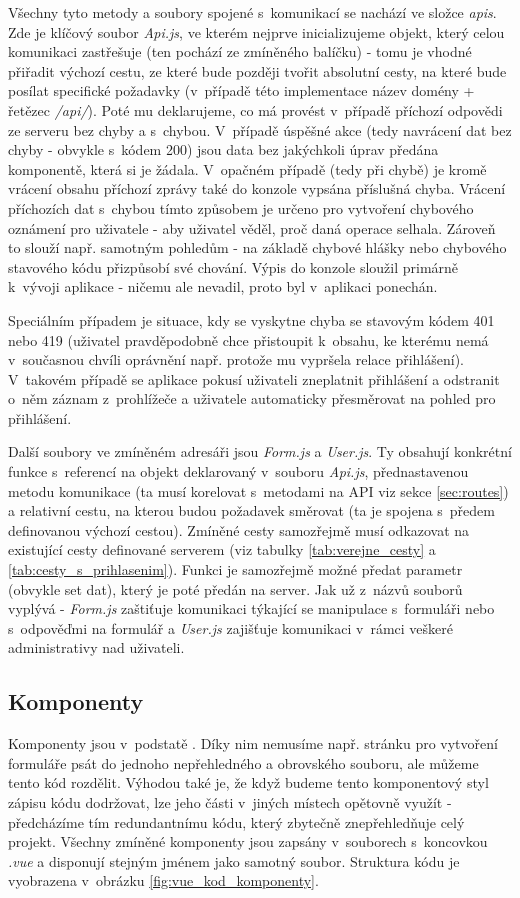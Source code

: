 	Všechny tyto metody a soubory spojené s~komunikací se nachází ve složce \textit{apis}. Zde je klíčový soubor \textit{Api.js}, ve kterém nejprve inicializujeme objekt, který celou komunikaci zastřešuje (ten pochází ze zmíněného balíčku) - tomu je vhodné přiřadit výchozí cestu, ze které bude později tvořit absolutní cesty, na které bude posílat specifické požadavky (v~případě této implementace název domény + řetězec \textit{/api/}). Poté mu deklarujeme, co má provést v~případě příchozí odpovědi ze serveru bez chyby a s~chybou. V~případě úspěšné akce (tedy navrácení dat bez chyby - obvykle s~kódem 200) jsou data bez jakýchkoli úprav předána komponentě, která si je žádala. V~opačném případě (tedy při chybě) je kromě vrácení obsahu příchozí zprávy také do konzole vypsána příslušná chyba. Vrácení příchozích dat s~chybou tímto způsobem je určeno pro vytvoření chybového oznámení pro uživatele - aby uživatel věděl, proč daná operace selhala. Zároveň to slouží např. samotným pohledům - na základě chybové hlášky nebo chybového stavového kódu přizpůsobí své chování. Výpis do konzole sloužil primárně k~vývoji aplikace - ničemu ale nevadil, proto byl v~aplikaci ponechán. 
	
	Speciálním případem je situace, kdy se vyskytne chyba se stavovým kódem 401 nebo 419 (uživatel pravděpodobně chce přistoupit k~obsahu, ke kterému nemá v~současnou chvíli oprávnění např. protože mu vypršela relace přihlášení). V~takovém případě se aplikace pokusí uživateli zneplatnit přihlášení a odstranit o~něm záznam z~prohlížeče a uživatele automaticky přesměrovat na pohled pro přihlášení.
	
	Další soubory ve zmíněném adresáři jsou \textit{Form.js} a \textit{User.js}. Ty obsahují konkrétní funkce s~referencí na objekt deklarovaný v~souboru \textit{Api.js}, přednastavenou metodu komunikace (ta musí korelovat s~metodami na API viz sekce \ref{sec:routes}) a relativní cestu, na kterou budou požadavek směrovat (ta je spojena s~předem definovanou výchozí cestou). Zmíněné cesty samozřejmě musí odkazovat na existující cesty definované serverem (viz tabulky \ref{tab:verejne_cesty} a \ref{tab:cesty_s_prihlasenim}). Funkci je samozřejmě možné předat parametr (obvykle set dat), který je poté předán na server. Jak už z~názvů souborů vyplývá - \textit{Form.js} zaštiťuje komunikaci týkající se manipulace s~formuláři nebo s~odpověďmi na formulář a \textit{User.js} zajišťuje komunikaci v~rámci veškeré administrativy nad uživateli.
	
	\subsection{Komponenty}\label{sec:komponenty}
	Komponenty jsou v~podstatě . Díky nim nemusíme např. stránku pro vytvoření formuláře psát do jednoho nepřehledného a obrovského souboru, ale můžeme tento kód rozdělit. Výhodou také je, že když budeme tento komponentový styl zápisu kódu dodržovat, lze jeho části v~jiných místech opětovně využít - předcházíme tím redundantnímu kódu, který zbytečně znepřehledňuje celý projekt. Všechny zmíněné komponenty jsou zapsány v~souborech s~koncovkou \textit{.vue} a disponují stejným jménem jako samotný soubor. Struktura kódu je vyobrazena v~obrázku \ref{fig:vue_kod_komponenty}.
		
